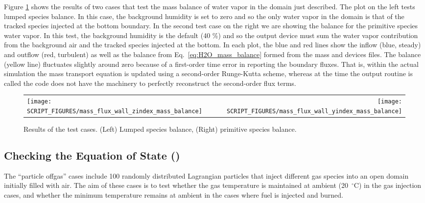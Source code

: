 \documentclass[11pt]{book}
\begin{document}
Figure \ref{fig:H2O_mass_balance} shows the results of two cases that test the mass balance of water vapor in the domain just described.  The plot on the left tests lumped species balance.  In this case, the background humidity is set to zero and so the only water vapor in the domain is that of the tracked species injected at the bottom boundary.  In the second test case on the right we are showing the balance for the primitive species water vapor.  In this test, the background humidity is the default (40 \%) and so the output device must sum the water vapor contribution from the background air and the tracked species injected at the bottom.  In each plot, the blue and red lines show the inflow (blue, steady) and outflow (red, turbulent) as well as the balance from Eq.~\ref{eq:H2O_mass_balance} formed from the mass and devices files.  The balance (yellow line) fluctuates slightly around zero because of a first-order time error in reporting the boundary fluxes.  That is, within the actual simulation the mass transport equation is updated using a second-order Runge-Kutta scheme, whereas at the time the output routine is called the code does not have the machinery to perfectly reconstruct the second-order flux terms.

\begin{figure}[ht]
\begin{tabular*}{\textwidth}{lr}
\texttt{[image: SCRIPT\_FIGURES/mass\_flux\_wall\_zindex\_mass\_balance]} &
\texttt{[image: SCRIPT\_FIGURES/mass\_flux\_wall\_yindex\_mass\_balance]}
\end{tabular*}
\caption[The  test cases]{Results of the  test cases.  (Left) Lumped species balance, (Right) primitive species balance.}
\label{fig:H2O_mass_balance}
\end{figure}

\subsection{Checking the Equation of State (\texorpdfstring{}{particle\_offgas})}
\label{particle_offgas_1}
\label{particle_offgas_2}
\label{particle_offgas_3}
\label{particle_offgas_4}

The ``particle offgas'' cases include 100 randomly distributed Lagrangian particles that inject different gas species into an open domain initially filled with air. The aim of these cases is to test whether the gas temperature is maintained at ambient (20~$^\circ$C) in the gas injection cases, and whether the minimum temperature remains at ambient in the cases where fuel is injected and burned.
\end{document}
